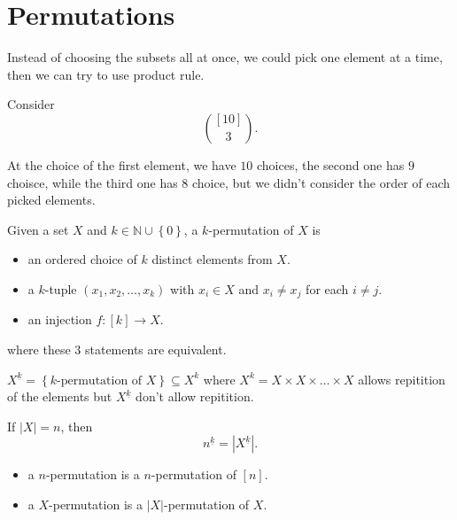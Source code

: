 \section{Permutations}
\begin{prev}
    Instead of choosing the subsets all at once, we could pick one element at a time, then we can try to use product rule.
\end{prev}

\begin{eg}
    Consider
    \[
        \binom{[10]}{3}.
    \]
\end{eg}
\begin{explanation}
    At the choice of the first element, we have \(10\) choices, the second one has \(9\) choisce, while the third one has \(8\) choice, but we didn't consider the order of each picked elements.   
\end{explanation}

\begin{definition}
    Given a set \(X\) and \(k \in \mathbb{N} \cup \left\{ 0 \right\} \), a \(k\)-permutation of \(X\) is 
    \begin{itemize}
        \item an ordered choice of \(k\) distinct elements from \(X\). 
        \item a \(k\)-tuple \((x_1, x_2, \dots , x_k)\) with \(x_i \in X\) and \(x_i \neq x_j\) for each \(i \neq j\). 
        \item an injection \(f: [k] \to X\).       
    \end{itemize}    
    where these \(3\) statements are equivalent. 
\end{definition}
\begin{notation}
    \(X^{\underline{k}} = \left\{ k\text{-permutation of } X \right\} \subseteq X^k \) where \(X^k = X \times X \times \dots \times X\) allows repitition of the elements but \(X^{\underline{k}}\) don't allow repitition. 
\end{notation}

\begin{note}
    If \(\vert X \vert = n\), then 
    \[
        n^{\underline{k}} = \left\vert X^{\underline{k}} \right\vert.
    \]
\end{note}

\begin{definition}
    \vphantom{text}
    \begin{itemize}
        \item a \(n\)-permutation is a \(n\)-permutation of \([n]\). 
        \item a \(X\)-permutation is a \(\left\vert X \right\vert \)-permutation of \(X\).      
    \end{itemize}
\end{definition}

